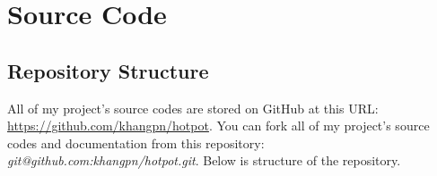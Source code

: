
\chapter{Source Code}


\section{Repository Structure}
\label{ch:appendix:repository_structure}  

All of my project's source codes are stored on GitHub at this URL: \href{https://github.com/khangpn/hotpot}{https://github.com/khangpn/hotpot}.
You can fork all of my project's source codes and documentation from this repository: \emph{git@github.com:khangpn/hotpot.git}.
Below is structure of the repository.

